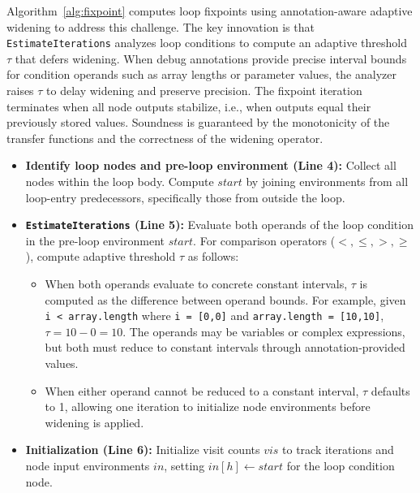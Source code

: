 \documentclass[pdflatex,sn-basic]{sn-jnl}%
\theoremstyle{thmstyleone}%
\theoremstyle{thmstyletwo}%
\theoremstyle{thmstylethree}%
\begin{document}
Algorithm~\ref{alg:fixpoint} computes loop fixpoints using annotation-aware adaptive widening to address this challenge.
The key innovation is that \texttt{EstimateIterations} analyzes loop conditions to compute an adaptive threshold $\tau$ that defers widening. When debug annotations provide precise interval bounds for condition operands such as array lengths or parameter values, the analyzer raises $\tau$ to delay widening and preserve precision. The fixpoint iteration terminates when all node outputs stabilize, i.e., when outputs equal their previously stored values. Soundness is guaranteed by the monotonicity of the transfer functions and the correctness of the widening operator.

\begin{itemize}
  \item \textbf{Identify loop nodes and pre-loop environment (Line 4):} Collect all nodes within the loop body. Compute $start$ by joining environments from all loop-entry predecessors, specifically those from outside the loop.

  \item \textbf{\texttt{EstimateIterations} (Line 5):} Evaluate both operands of the loop condition in the pre-loop environment $start$. For comparison operators ($<, \le, >, \ge$), compute adaptive threshold $\tau$ as follows:
  \begin{itemize}
    \item When both operands evaluate to concrete constant intervals, $\tau$ is computed as the difference between operand bounds. For example, given \texttt{i < array.length} where \texttt{i = [0,0]} and \texttt{array.length = [10,10]}, $\tau = 10 - 0 = 10$. The operands may be variables or complex expressions, but both must reduce to constant intervals through annotation-provided values.
    \item When either operand cannot be reduced to a constant interval, $\tau$ defaults to 1, allowing one iteration to initialize node environments before widening is applied.
  \end{itemize}

  \item \textbf{Initialization (Line 6):} Initialize visit counts $vis$ to track iterations and node input environments $in$, setting $in[h] \gets start$ for the loop condition node.


\end{itemize}
\end{document}
